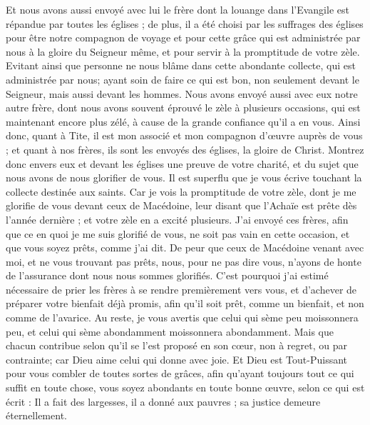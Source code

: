 \begin{multicols}{2}
Et nous avons aussi envoyé avec lui le frère dont la louange dans l'Evangile est répandue par toutes les églises ;
de plus, il a été choisi par les suffrages des églises pour être notre compagnon de voyage et pour cette grâce qui est administrée par nous à la gloire du Seigneur même, et pour servir à la promptitude de votre zèle. %
Evitant ainsi que personne ne nous blâme dans cette abondante collecte, qui est administrée par nous;
ayant soin de faire ce qui est bon, non seulement devant le Seigneur, mais aussi devant les hommes.
Nous avons envoyé aussi avec eux notre autre frère, dont nous avons souvent éprouvé le zèle à plusieurs occasions, qui est maintenant encore plus zélé, à cause de la grande confiance qu'il a en vous.
Ainsi donc, quant à Tite, il est mon associé et mon compagnon d’œuvre auprès de vous ; et quant à nos frères, ils sont les envoyés des églises, la gloire de Christ.
Montrez donc envers eux et devant les églises une preuve de votre charité, et du sujet que nous avons de nous glorifier de vous.
\VerseOne{}Il est superflu que je vous écrive touchant la collecte destinée aux saints.
Car je vois la promptitude de votre zèle, dont je me glorifie de vous devant ceux de Macédoine, leur disant que l’Achaïe est prête dès l'année dernière ; et votre zèle en a excité plusieurs.
J’ai envoyé ces frères, afin que ce en quoi je me suis glorifié de vous, ne soit pas vain en cette occasion, et que vous soyez prêts, comme j'ai dit.
De peur que ceux de Macédoine venant avec moi, et ne vous trouvant pas prêts, nous, pour ne pas dire vous, n'ayons de honte de l'assurance dont nous nous sommes glorifiés.
C'est pourquoi j'ai estimé nécessaire de prier les frères à se rendre premièrement vers vous, et d'achever de préparer votre bienfait déjà promis, afin qu'il soit prêt, comme un bienfait, et non comme de l'avarice.
Au reste, je vous avertis que celui qui sème peu moissonnera peu, et celui qui sème abondamment moissonnera abondamment.
Mais que chacun contribue selon qu'il se l'est proposé en son cœur, non à regret, ou par contrainte; car Dieu aime celui qui donne avec joie.
Et Dieu est Tout-Puissant pour vous combler de toutes sortes de grâces, afin qu'ayant toujours tout ce qui suffit en toute chose, vous soyez abondants en toute bonne œuvre,
selon ce qui est écrit : Il a fait des largesses, il a donné aux pauvres ; sa justice demeure éternellement.

\end{multicols}
